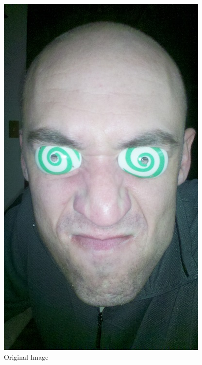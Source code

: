 \documentclass[10pt,twocolumn]{article}
\begin{document}
\begin{figure}
\centering
\begin{minipage}{0.15\textwidth}
\centering \includegraphics[width=\textwidth]{test3.jpg}
\caption{Original Image}
\end{minipage}
\begin{minipage}{0.15\textwidth}

\end{minipage}
\end{figure}
\end{document}
